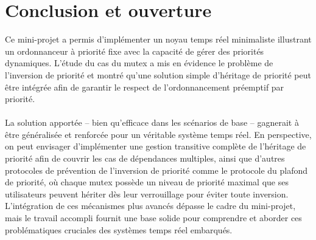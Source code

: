 \documentclass{latexPackage/utc-report/utc-report}
\begin{document}
\pagebreak

\section{Conclusion et ouverture}

Ce mini-projet a permis d’implémenter un noyau temps réel minimaliste illustrant un ordonnanceur à priorité fixe avec la capacité de gérer des priorités dynamiques. L’étude du cas du mutex a mis en évidence le problème de l’inversion de priorité et montré qu’une solution simple d’héritage de priorité peut être intégrée afin de garantir le respect de l’ordonnancement préemptif par priorité.
\\\\
La solution apportée – bien qu’efficace dans les scénarios de base – gagnerait à être généralisée et renforcée pour un véritable système temps réel. En perspective, on peut envisager d’implémenter une gestion transitive complète de l’héritage de priorité afin de couvrir les cas de dépendances multiples, ainsi que d’autres protocoles de prévention de l’inversion de priorité comme le protocole du plafond de priorité, où chaque mutex possède un niveau de priorité maximal que ses utilisateurs peuvent hériter dès leur verrouillage pour éviter toute inversion. L’intégration de ces mécanismes plus avancés dépasse le cadre du mini-projet, mais le travail accompli fournit une base solide pour comprendre et aborder ces problématiques cruciales des systèmes temps réel embarqués.
\end{document}
